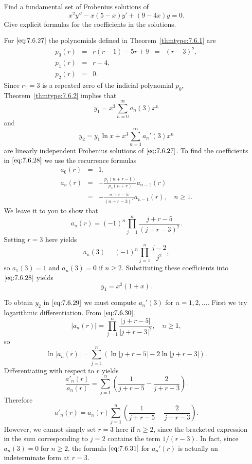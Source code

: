 \documentclass{ximera}
\begin{document}
\begin{example}\label{example:7.6.4}
Find a fundamental set of Frobenius solutions of
\begin{equation} \label{eq:7.6.27}
x^2y''-x(5-x)y'+(9-4x)y=0.
\end{equation}
Give explicit formulas for the coefficients in the solutions.

\begin{explanation}
For $\eqref{eq:7.6.27}$ the polynomials defined in Theorem~\ref{thmtype:7.6.1}
are
$$
\begin{array}{cclcc}
p_0(r)&=&r(r-1)-5r+9&=&(r-3)^2,\\
p_1(r)&=&r-4,\\
p_2(r)&=&0.
\end{array}
$$
Since $r_1=3$ is a repeated zero of the  indicial polynomial $p_0$,
Theorem~\ref{thmtype:7.6.2} implies that
\begin{equation} \label{eq:7.6.28}
y_1=x^3\sum_{n=0}^\infty  a_n(3)x^n
\end{equation}
and
\begin{equation} \label{eq:7.6.29}
y_2=y_1\ln x+x^3\sum_{n=1}^\infty a_n'(3)x^n
\end{equation}
are linearly independent Frobenius solutions of $\eqref{eq:7.6.27}$.
To find the coefficients in $\eqref{eq:7.6.28}$ we use the recurrence formulas
$$
\begin{array}{ccl}
a_0(r)&=&1,\\
a_n(r)&=&-\frac{p_1(n+r-1)}{p_0(n+r)}a_{n-1}(r)\\
&=&-\frac{n+r-5}{(n+r-3)^2}a_{n-1}(r),\quad n\geq 1.
\end{array}
$$
We leave it to you to show that
\begin{equation} \label{eq:7.6.30}
a_n(r)=(-1)^n\prod_{j=1}^n\frac{j+r-5}{(j+r-3)^2}.
\end{equation}
Setting $r=3$ here yields
$$
a_n(3)=(-1)^n\prod_{j=1}^n\frac{j-2}{j^2},
$$
so $a_1(3)=1$ and $a_n(3)=0$ if $n\ge2$. Substituting
these coefficients into $\eqref{eq:7.6.28}$ yields
$$
y_1=x^3(1+x).
$$

To obtain $y_2$ in $\eqref{eq:7.6.29}$ we must compute $a_n'(3)$
for $n=1, 2, \dots$.
First we try logarithmic differentiation.
From $\eqref{eq:7.6.30}$,
$$
|a_n(r)|=\prod_{j=1}^n\frac{|j+r-5|}{|j+r-3|^2},\quad n\geq 1,
$$
so
$$
\ln |a_n(r)|=\sum^n_{j=1} \left(\ln |j+r-5|-2\ln|j+r-3|\right).
$$
Differentiating  with respect to $r$ yields
$$
\frac{a'_n(r)}{a_n(r)}=\sum^n_{j=1} \left(\frac{1}{j+r-5}-\frac{2}{j+r-3}\right).
$$
Therefore
\begin{equation} \label{eq:7.6.31}
a'_n(r)=a_n(r) \sum^n_{j=1} \left(\frac{1}{j+r-5}-\frac{2}{j+r-3}\right).
\end{equation}
However, we cannot simply set $r=3$ here if $n\ge2$,  since the bracketed
expression in the sum corresponding to $j=2$ contains the term $1/(r-3)$.
In fact, since $a_n(3)=0$ for $n\ge2$, the formula $\eqref{eq:7.6.31}$ for
$a_n'(r)$ is actually an indeterminate form at $r=3$.


\end{explanation}
\end{example}
\end{document}

